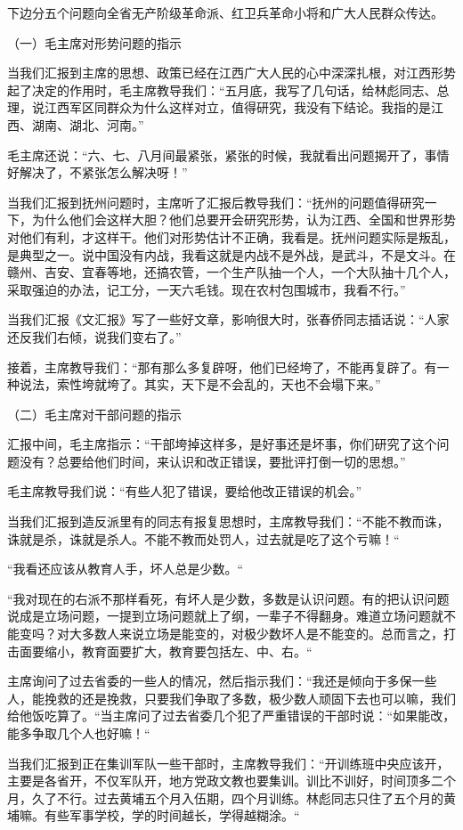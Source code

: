 {下边分五个问题向全省无产阶级革命派、红卫兵革命小将和广大人民群众传达。

（一）毛主席对形势问题的指示

当我们汇报到主席的思想、政策已经在江西广大人民的心中深深扎根，对江西形势起了决定的作用时，毛主席教导我们：“五月底，我写了几句话，给林彪同志、总理，说江西军区同群众为什么这样对立，值得研究，我没有下结论。我指的是江西、湖南、湖北、河南。”

毛主席还说：“六、七、八月间最紧张，紧张的时候，我就看出问题揭开了，事情好解决了，不紧张怎么解决呀！”

当我们汇报到抚州问题时，主席听了汇报后教导我们：“抚州的问题值得研究一下，为什么他们会这样大胆？他们总要开会研究形势，认为江西、全国和世界形势对他们有利，才这样干。他们对形势估计不正确，我看是。抚州问题实际是叛乱，是典型之一。说中国没有内战，我看这就是内战不是外战，是武斗，不是文斗。在赣州、吉安、宜春等地，还搞农管，一个生产队抽一个人，一个大队抽十几个人，采取强迫的办法，记工分，一天六毛钱。现在农村包围城市，我看不行。”

当我们汇报《文汇报》写了一些好文章，影响很大时，张春侨同志插话说：“人家还反我们右倾，说我们变右了。”

接着，主席教导我们：“那有那么多复辟呀，他们已经垮了，不能再复辟了。有一种说法，索性垮就垮了。其实，天下是不会乱的，天也不会塌下来。”

（二）毛主席对干部问题的指示

汇报中间，毛主席指示：“干部垮掉这样多，是好事还是坏事，你们研究了这个问题没有？总要给他们时间，来认识和改正错误，要批评打倒一切的思想。”

毛主席教导我们说：“有些人犯了错误，要给他改正错误的机会。”

当我们汇报到造反派里有的同志有报复思想时，主席教导我们：“不能不教而诛，诛就是杀，诛就是杀人。不能不教而处罚人，过去就是吃了这个亏嘛！“

“我看还应该从教育人手，坏人总是少数。“

“我对现在的右派不那样看死，有坏人是少数，多数是认识问题。有的把认识问题说成是立场问题，一提到立场问题就上了纲，一辈子不得翻身。难道立场问题就不能变吗？对大多数人来说立场是能变的，对极少数坏人是不能变的。总而言之，打击面要缩小，教育面要扩大，教育要包括左、中、右。“

主席询问了过去省委的一些人的情况，然后指示我们：“我还是倾向于多保一些人，能挽救的还是挽救，只要我们争取了多数，极少数人顽固下去也可以嘛，我们给他饭吃算了。“当主席问了过去省委几个犯了严重错误的干部时说：“如果能改，能多争取几个人也好嘛！“

当我们汇报到正在集训军队一些干部时，主席教导我们：“开训练班中央应该开，主要是各省开，不仅军队开，地方党政文教也要集训。训比不训好，时间顶多二个月，久了不行。过去黄埔五个月入伍期，四个月训练。林彪同志只住了五个月的黄埔嘛。有些军事学校，学的时间越长，学得越糊涂。“

}
